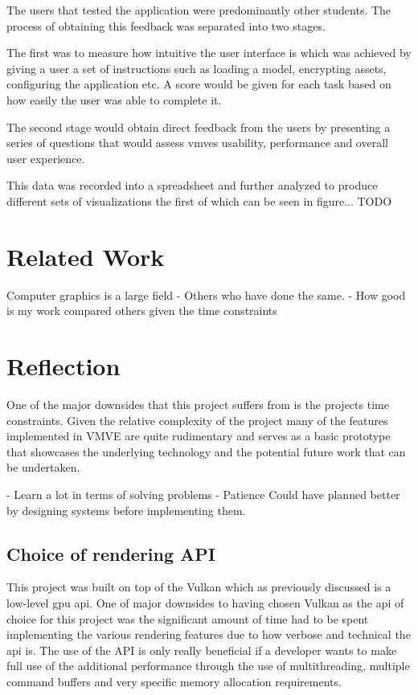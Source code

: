 \documentclass[11pt]{article}
\begin{document}
The users that tested the application were predominantly other students. The
process of obtaining this feedback was separated into two stages.

The first was to measure how intuitive the user interface is which was achieved
by giving a user a set of instructions such as loading a model, encrypting
assets, configuring the application etc. A score would be given for each task
based on how easily the user was able to complete it.

The second stage would obtain direct feedback from the users by presenting a
series of questions that would assess \glspl{vmve} usability, performance and
overall user experience.

This data was recorded into a spreadsheet and further analyzed to produce different
sets of visualizations the first of which can be seen in figure... TODO


\section{Related Work}
Computer graphics is a large field 
- Others who have done the same.
- How good is my work compared others given the time constraints

\section{Reflection}

One of the major downsides that this project suffers from is the projects time
constraints. Given the relative complexity of the project many of the features
implemented in VMVE are quite rudimentary and serves as a basic prototype that
showcases the underlying technology and the potential future work that can be
undertaken.



- Learn a lot in terms of solving problems
- Patience
Could have planned better by designing systems before implementing them.


\subsection{Choice of rendering API}
This project was built on top of the Vulkan which as previously discussed is a
low-level \gls{gpu} \gls{api}. One of major downsides to having chosen Vulkan as
the \gls{api} of choice for this project was the significant amount of time had
to be spent implementing the various rendering features due to how verbose and
technical the \gls{api} is. The use of the API is only really beneficial if a
developer wants to make full use of the additional performance through the use
of multithreading, multiple command buffers and very specific memory allocation
requirements.
\end{document}
